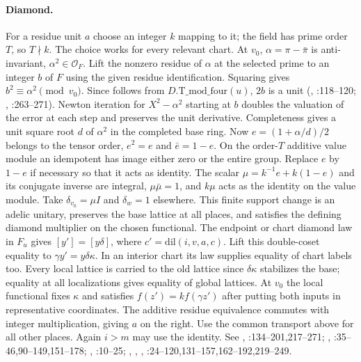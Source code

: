 \paragraph{Diamond.}
For a residue unit $a$ choose an integer $k$ mapping to it; the field
has prime order $T$, so $T\nmid k$. The choice works for every
relevant chart. At $v_0$, $\alpha=\pi-\bar\pi$ is anti-invariant,
$\alpha^2\in\mathcal O_F$. Lift the nonzero residue of $\alpha$ at the selected prime to an integer $b$ of $F$ using the given residue identification. Squaring gives $b^2\equiv\alpha^2\pmod {v_0}$. Since
 follows from $D.\mathrm{T\_mod\_four}(u)$,
$2b$ is a unit (, :118--120;
, :263--271). Newton iteration for $X^2-\alpha^2$
starting at $b$ doubles the valuation of the error at each step and
preserves the unit derivative. Completeness gives a unit square root
$d$ of $\alpha^2$ in the completed base ring. Now
$e=(1+\alpha/d)/2$ belongs to the tensor order,
$e^2=e$ and $\bar e=1-e$. On the order-$T$ additive value module an
idempotent has image either zero or the entire group. Replace $e$ by
$1-e$ if necessary so that it acts as identity. The scalar
$\mu=k^{-1}e+k(1-e)$ and its conjugate inverse are integral,
$\mu\bar\mu=1$, and $k\mu$ acts as the identity on the value module.
Take $\delta_{v_0}=\mu I$ and $\delta_w=1$ elsewhere. This finite
support change is an adelic unitary, preserves the base lattice at all
places, and satisfies the defining diamond multiplier on the chosen
functional. The endpoint or chart diamond law in $F_u$ gives
$[y']=[y\delta]$, where $c'=\mathrm{dil}(i,v,a,c)$. Lift this
double-coset equality to $\gamma y'=y\delta\kappa$. In an interior
chart its law supplies equality of chart labels too. Every local
lattice is carried to the old lattice since $\delta\kappa$ stabilizes
the base; equality at all localizations gives equality of global lattices.
At $v_0$ the local functional fixes $\kappa$ and satisfies
$f(z')=k f(\gamma z')$ after putting both inputs in representative
coordinates. The additive residue equivalence commutes with integer
multiplication, giving $a$ on the right. Use the common transport
above for all other places. Again $i>m$ may use the identity.
See , :134--201,217--271;
,
:35--46,90--149,151--178;
, :10--25;
, , ,
:24--120,131--157,162--192,219--249.

